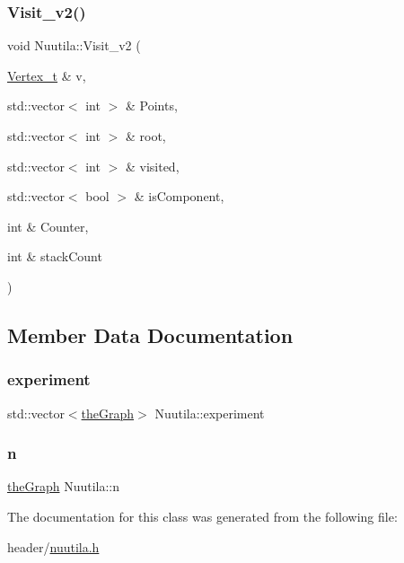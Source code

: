 \subsubsection{\texorpdfstring{Visit\+\_\+v2()}{Visit\_v2()}}
{\footnotesize\ttfamily void Nuutila\+::\+Visit\+\_\+v2 (\begin{DoxyParamCaption}\item[{\hyperlink{class_graph_component_ae67114a6ce5a001dc35e1996e1b45aa0}{Vertex\+\_\+t} \&}]{v,  }\item[{std\+::vector$<$ int $>$ \&}]{Points,  }\item[{std\+::vector$<$ int $>$ \&}]{root,  }\item[{std\+::vector$<$ int $>$ \&}]{visited,  }\item[{std\+::vector$<$ bool $>$ \&}]{is\+Component,  }\item[{int \&}]{Counter,  }\item[{int \&}]{stack\+Count }\end{DoxyParamCaption})}



\subsection{Member Data Documentation}
\mbox{\label{class_nuutila_a70e8a910cc4050d246db2540bd1e36c5}} 
\subsubsection{\texorpdfstring{experiment}{experiment}}
{\footnotesize\ttfamily std\+::vector$<$\hyperlink{class_graph_component_a982e0748a6e1b8dc74986f5f8b3dca5c}{the\+Graph}$>$ Nuutila\+::experiment}

\mbox{\label{class_nuutila_a1409929fa0f38709497f8bdb012af71c}} 
\subsubsection{\texorpdfstring{n}{n}}
{\footnotesize\ttfamily \hyperlink{class_graph_component_a982e0748a6e1b8dc74986f5f8b3dca5c}{the\+Graph} Nuutila\+::n}



The documentation for this class was generated from the following file\+:\begin{DoxyCompactItemize}
\item 
header/\hyperlink{nuutila_8h}{nuutila.\+h}\end{DoxyCompactItemize}
